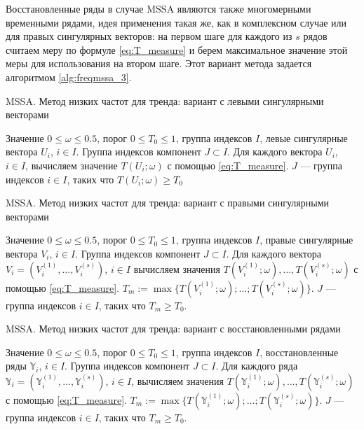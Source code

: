 \documentclass[specialist,
               substylefile = spbu.rtx,
               subf,href,colorlinks=true, 12pt]{disser}
\begin{document}
Восстановленные ряды в случае MSSA являются также многомерными временными рядами, идея применения такая же, как в комплексном случае или для правых сингулярных векторов: на первом шаге для каждого из $s$ рядов считаем меру по формуле \eqref{eq:T_measure} и берем максимальное значение этой меры для использования на втором шаге.
Этот вариант метода задается алгоритмом  \ref{alg:freqmssa_3}.

 \begin{algorithm}[!hhh]
\caption{MSSA. Метод низких частот для тренда: вариант с левыми сингулярными векторами}
\label{alg:freqmssa_1}
\begin{algorithmic}[1]
\REQUIRE Значение  $0 \leqslant  \omega \leqslant 0.5$, порог $0 \leqslant T_0 \leqslant 1$, группа индексов $I$, левые сингулярные вектора $U_i$, $i \in I$.
\ENSURE Группа индексов компонент $J \subset I$.
\STATE  Для каждого вектора $U_i$, $i \in I$, вычисляем значение $T(U_i; \omega)$ с помощью  \eqref{eq:T_measure}.
\STATE $J$ --- группа индексов $i \in I$, таких что $T(U_i; \omega) \geqslant T_0$
\end{algorithmic}
\end{algorithm}

\begin{algorithm}[!hhh]
\caption{MSSA. Метод низких частот для тренда: вариант с правыми сингулярными векторами}
\label{alg:freqmssa_2}
\begin{algorithmic}[1]
\REQUIRE Значение  $0 \leqslant  \omega \leqslant 0.5$, порог $0 \leqslant T_0 \leqslant 1$, группа индексов $I$,
правые сингулярные вектора $V_i$, $i \in I$.
\ENSURE Группа индексов компонент $J \subset I$.
\STATE  Для каждого вектора ${V}_{i} = ({V}_i^{(1)}, \ldots,{V}_i^{(s)})$, $i \in I$
 вычисляем значения $T(V_i^{(1)}; \omega), \ldots,
T(V_i^{(s)}; \omega)$ с помощью  \eqref{eq:T_measure}. $T_m := \max \{T(V_i^{(1)}; \omega); \ldots;
T(V_i^{(s)}; \omega)\}$.
\STATE $J$ --- группа индексов $i \in I$, таких что $T_m \geqslant T_0$.
\end{algorithmic}
\end{algorithm}

\begin{algorithm}[!hhh]
\caption{MSSA. Метод низких частот для тренда: вариант с восстановленными рядами}
\label{alg:freqmssa_3}
\begin{algorithmic}[1]
\REQUIRE Значение  $0 \leqslant  \omega \leqslant 0.5$, порог $0 \leqslant T_0 \leqslant 1$, группа индексов $I$,
восстановленные ряды $\mathbb{Y}_{i}$, $i \in I$.
\ENSURE Группа индексов компонент $J \subset I$.
\STATE  Для каждого ряда $\mathbb{Y}_{i} = (\mathbb{Y}_i^{(1)}, \ldots, \mathbb{Y}_i^{(s)})$, $i \in I$, вычисляем значения $T(\mathbb{Y}_i^{(1)}; \omega), \ldots,
T(\mathbb{Y}_i^{(s)}; \omega)$ с помощью  \eqref{eq:T_measure}. $T_m := \max \{T(\mathbb{Y}_i^{(1)}; \omega); \ldots;
T(\mathbb{Y}_i^{(s)}; \omega)\}$.
\STATE $J$ --- группа индексов $i \in I$, таких что $T_m \geqslant T_0$.
\end{algorithmic}
\end{algorithm}
\end{document}
